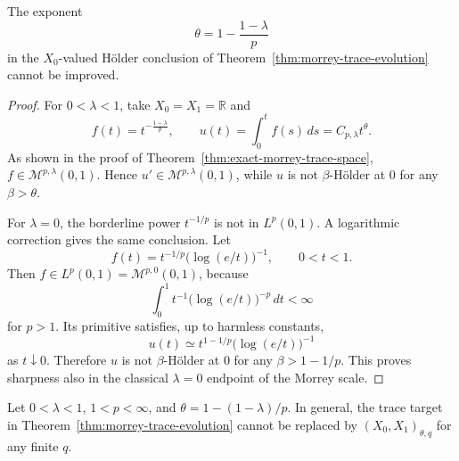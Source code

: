 \documentclass[smallextended,envcountsect,envcountsame]{svjour3}
\begin{document}
	\begin{proposition}\label{prop:sharp-morrey-holder-exponent}
	The exponent
	\[
	\theta=1-\frac{1-\lambda}{p}
	\]
	in the \(X_0\)-valued H\"older conclusion of Theorem~\ref{thm:morrey-trace-evolution} cannot be improved.
	\end{proposition}

	\begin{proof}
	For \(0<\lambda<1\), take \(X_0=X_1=\mathbb R\) and
	\[
	f(t)=t^{-\frac{1-\lambda}{p}},
	\qquad
	u(t)=\int_0^t f(s)\,ds=C_{p,\lambda}t^\theta.
	\]
	As shown in the proof of Theorem~\ref{thm:exact-morrey-trace-space}, \(f\in\mathcal M^{p,\lambda}(0,1)\).  Hence \(u'\in\mathcal M^{p,\lambda}(0,1)\), while \(u\) is not \(\beta\)-H\"older at \(0\) for any \(\beta>\theta\).

	For \(\lambda=0\), the borderline power \(t^{-1/p}\) is not in \(L^p(0,1)\).  A logarithmic correction gives the same conclusion.  Let
	\[
	f(t)=t^{-1/p}\bigl(\log(e/t)\bigr)^{-1},
	\qquad 0<t<1.
	\]
	Then \(f\in L^p(0,1)=\mathcal M^{p,0}(0,1)\), because
	\[
	\int_0^1 t^{-1}\bigl(\log(e/t)\bigr)^{-p}\,dt<\infty
	\]
	for \(p>1\).  Its primitive satisfies, up to harmless constants,
	\[
	u(t)\simeq t^{1-1/p}\bigl(\log(e/t)\bigr)^{-1}
	\]
	as \(t\downarrow0\).  Therefore \(u\) is not \(\beta\)-H\"older at \(0\) for any \(\beta>1-1/p\).  This proves sharpness also in the classical \(\lambda=0\) endpoint of the Morrey scale.
	\end{proof}

	\begin{proposition}\label{prop:q-infty-forced}
	Let \(0<\lambda<1\), \(1<p<\infty\), and \(\theta=1-(1-\lambda)/p\).  In general, the trace target in Theorem~\ref{thm:morrey-trace-evolution} cannot be replaced by \((X_0,X_1)_{\theta,q}\) for any finite \(q\).
	\end{proposition}
\end{document}
